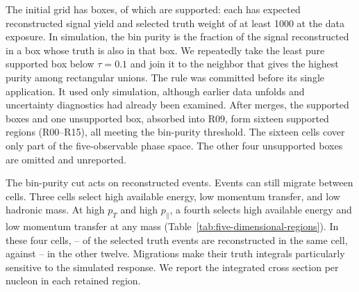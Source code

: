 The initial grid has  boxes, of which  are supported: each has expected reconstructed signal yield and selected truth weight of at least 1000 at the data exposure. In simulation, the bin purity is the fraction of the signal reconstructed in a box whose truth is also in that box. We repeatedly take the least pure supported box below $\tau=0.1$ and join it to the neighbor that gives the highest purity among rectangular unions. The rule was committed before its single application. It used only simulation, although earlier data unfolds and uncertainty diagnostics had already been examined. After  merges, the supported boxes and one unsupported box, absorbed into R09, form sixteen supported regions (R00--R15), all meeting the bin-purity threshold. The sixteen cells cover only part of the five-observable phase space. The other four unsupported boxes are omitted and unreported.

The bin-purity cut acts on reconstructed events. Events can still migrate between cells. Three cells select high available energy, low momentum transfer, and low hadronic mass. At high $p_T$ and high $p_\parallel$, a fourth selects high available energy and low momentum transfer at any mass (Table~\ref{tab:five-dimensional-regions}). In these four cells, -- of the selected truth events are reconstructed in the same cell, against -- in the other twelve. Migrations make their truth integrals particularly sensitive to the simulated response. We report the integrated cross section per nucleon in each retained region.

